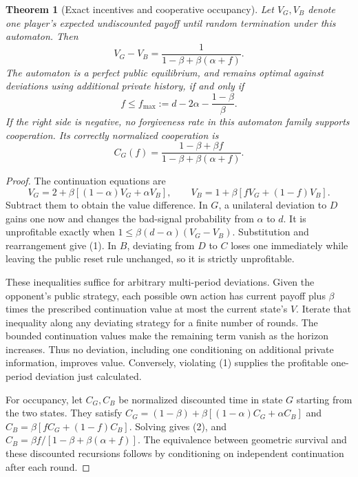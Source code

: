 \documentclass[11pt,a4paper]{article}
\newtheorem{theorem}{Theorem}[section]
\theoremstyle{remark}
\begin{document}
\begin{theorem}[Exact incentives and cooperative occupancy]
Let $V_G,V_B$ denote one player's expected undiscounted payoff until random termination under this automaton. Then
\[
 V_G-V_B=\frac1{1-\beta+\beta(\alpha+f)}.
\]
The automaton is a perfect public equilibrium, and remains optimal against deviations using additional private history, if and only if
\[
 f\le f_{\max}:=d-2\alpha-\frac{1-\beta}{\beta}. \tag{1}
\]
If the right side is negative, no forgiveness rate in this automaton family supports cooperation. Its correctly normalized cooperation is
\[
 C_G(f)=\frac{1-\beta+\beta f}{1-\beta+\beta(\alpha+f)}. \tag{2}
\]
\end{theorem}
\begin{proof}
The continuation equations are
\[
 V_G=2+\beta[(1-\alpha)V_G+\alpha V_B],\qquad
 V_B=1+\beta[fV_G+(1-f)V_B].
\]
Subtract them to obtain the value difference. In $G$, a unilateral deviation to $D$ gains one now and changes the bad-signal probability from $\alpha$ to $d$. It is unprofitable exactly when
$1\le\beta(d-\alpha)(V_G-V_B)$.
Substitution and rearrangement give (1). In $B$, deviating from $D$ to $C$ loses one immediately while leaving the public reset rule unchanged, so it is strictly unprofitable.

These inequalities suffice for arbitrary multi-period deviations. Given the opponent's public strategy, each possible own action has current payoff plus $\beta$ times the prescribed continuation value at most the current state's $V$. Iterate that inequality along any deviating strategy for a finite number of rounds. The bounded continuation values make the remaining term vanish as the horizon increases. Thus no deviation, including one conditioning on additional private information, improves value. Conversely, violating (1) supplies the profitable one-period deviation just calculated.

For occupancy, let $C_G,C_B$ be normalized discounted time in state $G$ starting from the two states. They satisfy
$C_G=(1-\beta)+\beta[(1-\alpha)C_G+\alpha C_B]$ and
$C_B=\beta[fC_G+(1-f)C_B]$.
Solving gives (2), and $C_B=\beta f/[1-\beta+\beta(\alpha+f)]$. The equivalence between geometric survival and these discounted recursions follows by conditioning on independent continuation after each round.
\end{proof}
\end{document}
